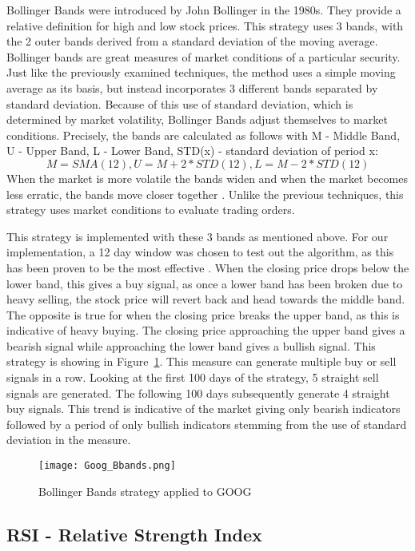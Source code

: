 \documentclass[../thesis.tex]{subfiles}
\begin{document}
Bollinger Bands were introduced by John Bollinger in the 1980s\cite{Liu2006}. They provide a relative definition for high and low stock prices. This strategy uses 3 bands, with the 2 outer bands derived from a standard deviation of the moving average. Bollinger bands are great measures of market conditions of a particular security. Just like the previously examined techniques, the method uses a simple moving average as its basis, but instead incorporates 3 different bands separated by standard deviation. Because of this use of standard deviation, which is determined by market volatility, Bollinger Bands adjust themselves to market conditions. Precisely, the bands are calculated as follows with M - Middle Band, U - Upper Band, L - Lower Band, STD(x) - standard deviation of period x: \[M = SMA(12), U = M + 2 * STD(12),  L = M - 2 * STD(12)\] When the market is more volatile the bands widen and when the market becomes less erratic, the bands move closer together \cite{Liu2006}. Unlike the previous techniques, this strategy uses market conditions to evaluate trading orders.

This strategy is implemented with these 3 bands as mentioned above. For our implementation, a 12 day window was chosen to test out the algorithm, as this has been proven to be the most effective \cite{Liu2006}. When the closing price drops below the lower band, this gives a buy signal, as once a lower band has been broken due to heavy selling, the stock price will revert back and head towards the middle band. The opposite is true for when the closing price breaks the upper band, as this is indicative of heavy buying. The closing price approaching the upper band gives a bearish signal while approaching the lower band gives a bullish signal.  This strategy is showing in Figure~\ref{BBANDSfigure}. This measure can generate multiple buy or sell signals in a row. Looking at the first 100 days of the strategy, 5 straight sell signals are generated. The following 100 days subsequently generate 4 straight buy signals. This trend is indicative of the market giving only bearish indicators followed by a period of only bullish indicators stemming from the use of standard deviation in the measure.

\begin{figure}[h]
\centering
\texttt{[image: Goog\_Bbands.png]}
\caption{Bollinger Bands strategy applied to GOOG  \label{overflow}}
\label{BBANDSfigure}
\end{figure}

\subsection{RSI - Relative Strength Index}
\end{document}
